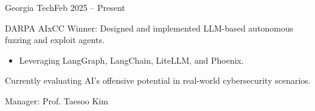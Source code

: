 
\begin{timeitemize}{Georgia Tech}{Feb 2025 -- Present}
    \item DARPA AIxCC Winner: Designed and implemented LLM-based autonomous fuzzing and exploit agents.
        \begin{itemize}[label=·]
        \item Leveraging LangGraph, LangChain, LiteLLM, and Phoenix.
        \end{itemize}
    \item Currently evaluating AI's offensive potential in real-world cybersecurity scenarios.
    \item Manager: Prof. Taesoo Kim
\end{timeitemize}

